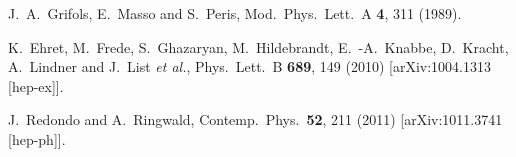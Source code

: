 \documentclass[12pt]{article}
\begin{document}
\begin{thebibliography}{99}
  J.~A.~Grifols, E.~Masso and S.~Peris,
  Mod.\ Phys.\ Lett.\ A {\bf 4}, 311 (1989).
  
  K.~Ehret, M.~Frede, S.~Ghazaryan, M.~Hildebrandt, E.~-A.~Knabbe, D.~Kracht, A.~Lindner and J.~List {\it et al.},
  Phys.\ Lett.\ B {\bf 689}, 149 (2010)
  [arXiv:1004.1313 [hep-ex]].
  
  J.~Redondo and A.~Ringwald,
  Contemp.\ Phys.\  {\bf 52}, 211 (2011)
  [arXiv:1011.3741 [hep-ph]].



\end{thebibliography}
\end{document}
